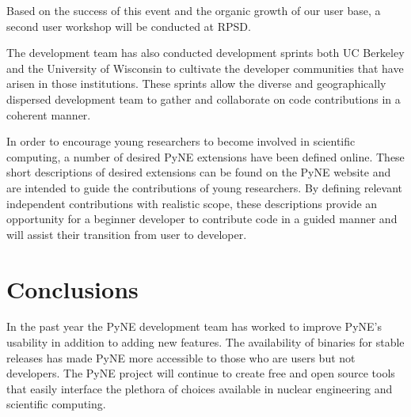 \documentclass{anstrans}
\begin{document}
Based on the success of this event and the organic growth of our user base, a second user workshop will be conducted at RPSD.

The development team has also conducted development sprints both UC Berkeley and the University of Wisconsin to cultivate the developer communities that have arisen in those institutions. These sprints allow the diverse and geographically dispersed development team to gather and collaborate on code contributions in a coherent manner.

In order to encourage young researchers to become involved in scientific computing, a number of desired PyNE extensions have been defined online. These short descriptions of desired extensions can be found on the PyNE website and are intended to guide the contributions of young researchers. By defining relevant independent contributions with realistic scope, these descriptions provide an opportunity for a beginner developer to contribute code in a guided manner and will assist their transition from user to developer.

\section{Conclusions}

In the past year the PyNE development team has worked to improve PyNE's 
usability in addition to adding new features. The availability of binaries 
for stable releases has made PyNE more accessible to those who are users 
but not developers. The PyNE project will continue to create free and open 
source tools that easily interface the plethora of choices available in 
nuclear engineering and scientific computing. 

 
 
\end{document}
